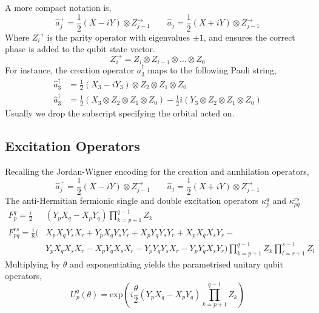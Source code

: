 A more compact notation is,
\begin{equation*}
    \hat a_j^+ = \frac{1}{2} (X - iY) \otimes Z^\rightarrow_{j-1} \qquad
    \hat a_j = \frac{1}{2} (X + iY) \otimes Z^\rightarrow_{j-1}
\end{equation*}
Where $Z^\rightarrow_{i}$ is the parity operator with eigenvalues $\pm 1$, and ensures the correct phase is added to the qubit state vector.
\begin{equation*}
    Z^\rightarrow_{i} = Z_i \otimes Z_{i-1} \otimes \dots \otimes Z_0
\end{equation*}
For instance, the creation operator $a^\dagger_3$ maps to the following Pauli string,
\begin{align*}
    \hat a_3^\dagger &=
    \frac{1}{2} (X_3 - iY_3) \otimes Z_2 \otimes Z_1 \otimes Z_0 \\
    \hat a_3^\dagger &=
    \frac{1}{2} ( X_3 \otimes Z_2 \otimes Z_1 \otimes Z_0 ) -
    \frac{1}{2} i ( Y_3 \otimes Z_2 \otimes Z_1 \otimes Z_0 )
\end{align*}
Usually we drop the subscript specifying the orbital acted on.

\subsection{Excitation Operators}

Recalling the Jordan-Wigner encoding for the creation and annhilation operators,
\begin{equation*}
    \hat a_j^+ = \frac{1}{2} (X - iY) \otimes Z^\rightarrow_{j-1} \qquad
    \hat a_j = \frac{1}{2} (X + iY) \otimes Z^\rightarrow_{j-1}
\end{equation*}
The anti-Hermitian fermionic single and double excitation operators $\kappa_p^q$ and $\kappa_{pq}^{rs}$
\begin{align*}
    F_p^q = \frac{i}{2} & (Y_p X_q - X_p Y_q) \prod_{k=p+1}^{q-1} Z_k \\
    F_{pq}^{rs} = \frac{i}{8} (
      & X_p X_q Y_s X_r +
        Y_p X_q Y_s Y_r +
        X_p Y_q Y_s Y_r +
        X_p X_q X_s Y_r - \\
      & Y_p X_q X_s X_r -
        X_p Y_q X_s X_r -
        Y_p Y_q Y_s X_r -
        Y_p Y_q X_s Y_r )
    \prod_{k=p+1}^{q-1} Z_k
    \prod_{l=r+1}^{s-1} Z_l
\end{align*}
Multiplying by $\theta$ and exponentiating yields the parametrised unitary qubit operators,
\begin{equation*}
    U^q_p (\theta) =
    \text{exp} \left( i
    \frac{\theta}{2} (Y_p X_q - X_p Y_q) \prod_{k=p+1}^{q-1} Z_k \right)
\end{equation*}

